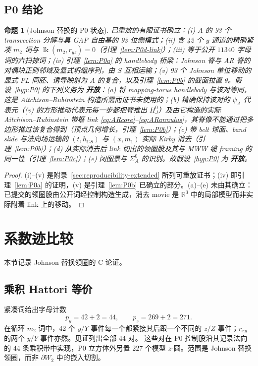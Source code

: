 \documentclass[11pt]{amsart}
\newtheorem{proposition}[theorem]{命题}
\theoremstyle{definition}
\theoremstyle{remark}
\newcommand{\Open}{\textbf{开放}}
\begin{document}
\subsection{P0 结论}\label{sec:p0-conclusion}

\begin{proposition}[Johnson 替换的 P0 状态]\label{thm:P0discharge}
已重放的有限证书确立：(i) $A$ 的 93 个 transvection 分解与具 GAP 自由基的 93 位侧模式；(ii) 含 42 个 $y$ 通道的精确紧凑 $m_2$ 词与 $\operatorname{lk}(m_2,r_{yz})=0$（引理~\ref{lem:P0d-link}）；(iii) 等于公开 $11340$ 字母词的六扫掠词；(iv) 引理~\ref{lem:P0a} 的 handlebody 桥梁：Johnson 脊与 AR 脊的对偶块正则邻域及显式坍缩序列，由 $S$ 互相运输；(v) 93 个 Johnson 单位移动的显式 PL 同胚、诱导映射为 $A$ 的复合，以及引理~\ref{lem:P0b} 的截面拉直 $\theta$。假设~\ref{hyp:P0} 的下列义务为 \Open：(a) 将 mapping-torus handlebody 与该对等同，这是 Aitchison--Rubinstein 构造所需而证书未使用的；(b) 精确保持该对的 $\psi_A$ 代表元（(v) 的方形推动代表元每一步都把脊推出 $H_J^0$）及由它构造的实际 Aitchison--Rubinstein 带框 link \eqref{eq:ARcore}--\eqref{eq:ARannulus}，其脊像不能通过把多边形推过该复合得到（顶点几何增长，引理~\ref{lem:P0b}）；(c) 带 belt 球面、band slide 与法向场运输的 $(t,h_{CS})$ 与 $(x,m_1)$ 实际 Kirby 消去（引理~\ref{lem:P0b}）；(d) 从实际消去后 link 切出的领圈股及其与 MWW 缆 framing 的同一性（引理~\ref{lem:P0c}）；(e) 闭图景与 $\Sigma_A^0$ 的识别。故假设~\ref{hyp:P0} 为 \Open。
\end{proposition}

\begin{proof}
(i)--(v) 是附录~\ref{sec:reproducibility-extended} 所列可重放证书；(iv) 即引理~\ref{lem:P0a} 的证明，(v) 是引理~\ref{lem:P0b} 已确立的部分。(a)--(e) 未由其确立：已提交的领圈股由公开词经控制构造生成，消去 movie 是 $\mathbb R^3$ 中的局部模型而非实际附着 link 上的移动。
\end{proof}
\section{系数迹比较}\label{sec:c-comparison}

本节记录 Johnson 替换领圈的 C 论证。

\subsection{乘积 Hattori 等价}

紧凑词给出字母计数
\[
p_y=42+2=44,\qquad p_z=269+2=271.
\]
在循环 $m_2$ 词中，42 个 $y/Y$ 事件每一个都紧接其后跟一个不同的 $z/Z$ 事件；$r_{xy}$ 的两个 $y/Y$ 事件亦然。见证列出全部 44 对。
这些对在 P0 控制股沿其记录法向的 44 条乘积带中实现，P0 立方体外另置 $227$ 个模型 $z$-圆。范围是 Johnson 替换领圈，而非 $\partial W_2$ 中的嵌入切割。
\end{document}
